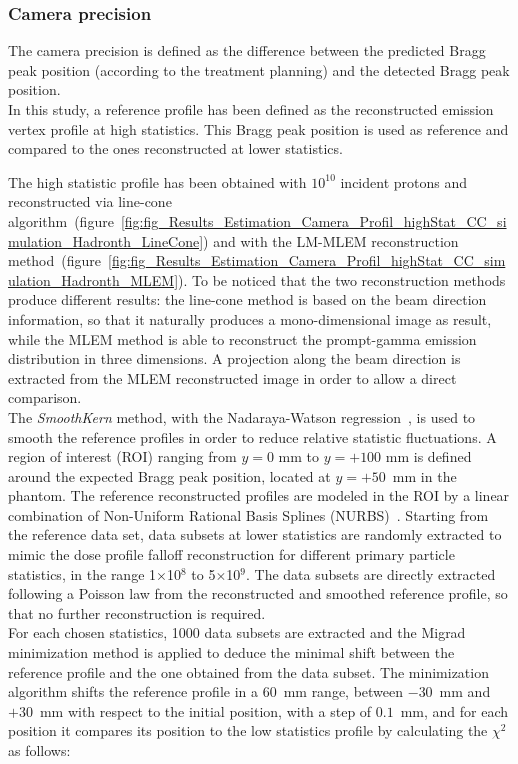 \subsubsection{Camera precision}
\label{MatMeth:precision}

The camera precision is defined as the difference between the predicted Bragg peak position (according to the treatment planning) and the detected Bragg peak position.\\
 
In this study, a reference profile has been defined as the reconstructed emission vertex profile at high statistics. This Bragg peak position is used as reference and compared to the ones reconstructed at lower statistics.

The high statistic profile has been obtained with $\mathrm{10^{10}}$ incident protons and reconstructed via line-cone algorithm~(figure~\ref{fig:fig_Results_Estimation_Camera_Profil_highStat_CC_simulation_Hadronth_LineCone}) and with the LM-MLEM reconstruction method~(figure~\ref{fig:fig_Results_Estimation_Camera_Profil_highStat_CC_simulation_Hadronth_MLEM}). To be noticed that the two reconstruction methods produce different results: the line-cone method is based on the beam direction information, so that it naturally produces a mono-dimensional image as result, while the MLEM method is able to reconstruct the prompt-gamma emission distribution in three dimensions. A projection along the beam direction is extracted from the MLEM reconstructed image in order to allow a direct comparison.\\  
The \textit{SmoothKern} method, with the Nadaraya-Watson regression~\cite{Nadaraya_regression, Watson_regression}, is used to smooth the reference profiles in order to reduce relative statistic fluctuations.\newline
A region of interest (ROI) ranging from $y=0$ mm to $y=+100$ mm is defined around the expected Bragg peak position, located at $y=+50$~mm in the phantom. The reference reconstructed profiles are modeled in the ROI by a linear combination of Non-Uniform Rational Basis Splines (NURBS)~\cite{NURBS}. \newline
Starting from the reference data set, data subsets at lower statistics are randomly extracted to mimic the dose profile falloff reconstruction for different primary particle statistics, in the range 1$\times$10$^8$ to 5$\times$10$^9$. The data subsets are directly extracted following a Poisson law from the reconstructed and smoothed reference profile, so that no further reconstruction is required.\\
For each chosen statistics, 1000 data subsets are extracted and the Migrad minimization method is applied to deduce the minimal shift between the reference profile and the one obtained from the data subset. The minimization algorithm shifts the reference profile in a 60~mm range, between $-30$~mm and $+30$~mm with respect to the initial position, with a step of $0.1$~mm, and for each position it compares its position to the low statistics profile by calculating the $\chi^2$ as follows:

